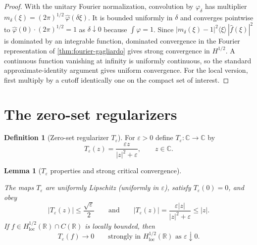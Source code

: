 \documentclass[11pt,oneside]{book}
\providecommand{\uses}[1]{}
\newtheorem{lemma}[theorem]{Lemma}
\theoremstyle{definition}
\newtheorem{definition}[theorem]{Definition}
\theoremstyle{remark}
\newcommand{\R}{\mathbb R}
\newcommand{\C}{\mathbb C}
\newcommand{\1}{\mathbf 1}
\newcommand{\loc}{\mathrm{loc}}
\newcommand{\eps}{\varepsilon}
\begin{document}
\begin{proof}
\uses{def:fourier-convention, thm:fourier-gagliardo}
With the unitary Fourier normalization, convolution by $\varphi_\delta$ has multiplier $m_\delta(\xi)=(2\pi)^{1/2}\,\widehat\varphi(\delta\xi)$. It is bounded uniformly in $\delta$ and converges pointwise to $\widehat\varphi(0)\cdot(2\pi)^{1/2}=1$ as $\delta\downarrow0$ because $\int\varphi=1$. Since $|m_\delta(\xi)-1|^2\langle\xi\rangle\,|\widehat f(\xi)|^2$ is dominated by an integrable function, dominated convergence in the Fourier representation of \cref{thm:fourier-gagliardo} gives strong convergence in $H^{1/2}$. A continuous function vanishing at infinity is uniformly continuous, so the standard approximate-identity argument gives uniform convergence. For the local version, first multiply by a cutoff identically one on the compact set of interest.
\end{proof}

\section{The zero-set regularizers}

\begin{definition}[Zero-set regularizer $T_\eps$]\label{def:Teps-regularizer}
For $\eps>0$ define $T_\eps:\C\to\C$ by
\begin{equation}
 T_\eps(z)=\frac{\eps z}{|z|^2+\eps},
 \qquad z\in\C.
 \label{eq:Teps-def}
\end{equation}
\end{definition}

\begin{lemma}[$T_\eps$ properties and strong critical convergence]\label{lem:Teps}
\uses{def:Teps-regularizer, def:Hs-loc}
The maps $T_\eps$ are uniformly Lipschitz (uniformly in $\eps$), satisfy $T_\eps(0)=0$, and obey
\begin{equation}
 |T_\eps(z)|\le\frac{\sqrt\eps}{2}
 \qquad\text{and}\qquad
 |T_\eps(z)|=\frac{\eps|z|}{|z|^2+\eps}\le|z|.
 \label{eq:Teps-bounds}
\end{equation}
If $f\in H^{1/2}_{\loc}(\R)\cap C(\R)$ is locally bounded, then
\begin{equation}
 T_\eps(f)\longrightarrow0
 \qquad\text{strongly in }H^{1/2}_{\loc}(\R)
 \text{ as }\eps\downarrow0.
 \label{eq:Teps-strong}
\end{equation}
\end{lemma}
\end{document}
